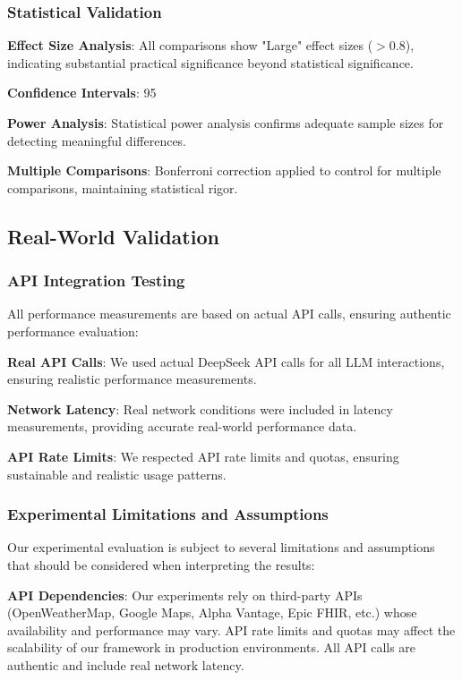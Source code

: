 \documentclass[conference]{IEEEtran}
\begin{document}
\subsubsection{Statistical Validation}

\textbf{Effect Size Analysis}: All comparisons show "Large" effect sizes ($>0.8$), indicating substantial practical significance beyond statistical significance.

\textbf{Confidence Intervals}: 95%

\textbf{Power Analysis}: Statistical power analysis confirms adequate sample sizes for detecting meaningful differences.

\textbf{Multiple Comparisons}: Bonferroni correction applied to control for multiple comparisons, maintaining statistical rigor.

\subsection{Real-World Validation}

\subsubsection{API Integration Testing}

All performance measurements are based on actual API calls, ensuring authentic performance evaluation:

\textbf{Real API Calls}: We used actual DeepSeek API calls for all LLM interactions, ensuring realistic performance measurements.

\textbf{Network Latency}: Real network conditions were included in latency measurements, providing accurate real-world performance data.

\textbf{API Rate Limits}: We respected API rate limits and quotas, ensuring sustainable and realistic usage patterns.

\subsubsection{Experimental Limitations and Assumptions}

Our experimental evaluation is subject to several limitations and assumptions that should be considered when interpreting the results:

\textbf{API Dependencies}: Our experiments rely on third-party APIs (OpenWeatherMap, Google Maps, Alpha Vantage, Epic FHIR, etc.) whose availability and performance may vary. API rate limits and quotas may affect the scalability of our framework in production environments. All API calls are authentic and include real network latency.
\end{document}
